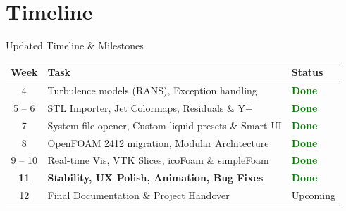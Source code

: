 \documentclass[dvipsnames,mathserif]{beamer}
\begin{document}
\section{Timeline}
\begin{frame}{Updated Timeline \& Milestones}
    \begin{table}
    \centering
    \footnotesize
    \begin{tabular}{|c|p{6.5cm}|l|}
    \hline
    \textbf{Week} & \textbf{Task} & \textbf{Status} \\ \hline
    4 & Turbulence models (RANS), Exception handling & \textcolor{green}{\textbf{Done}} \\ \hline
    5 -- 6 & STL Importer, Jet Colormaps, Residuals \& Y+ & \textcolor{green}{\textbf{Done}} \\ \hline
    7 & System file opener, Custom liquid presets \& Smart UI & \textcolor{green}{\textbf{Done}} \\ \hline
    8 & OpenFOAM 2412 migration, Modular Architecture & \textcolor{green}{\textbf{Done}} \\ \hline
    9 -- 10 & Real-time Vis, VTK Slices, icoFoam \& simpleFoam & \textcolor{green}{\textbf{Done}} \\ \hline
    \textbf{11} & \textbf{Stability, UX Polish, Animation, Bug Fixes} & \textcolor{green}{\textbf{Done}} \\ \hline
    12 & Final Documentation \& Project Handover & Upcoming \\ \hline
    \end{tabular}
    \end{table}
\end{frame}

\end{document}

